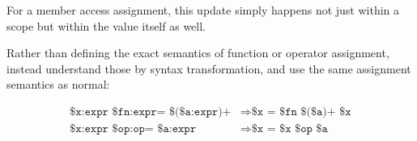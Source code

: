 For a member access assignment, this update simply happens not just within
a scope but within the value itself as well.

\begin{prooftree}
\end{prooftree}

Rather than defining the exact semantics of function or operator assignment,
instead understand those by syntax transformation, and use the same assignment
semantics as normal:

\begin{align*}
    \texttt{\$x:expr \$fn:expr= \$(\$a:expr)+} &\Rightarrow \texttt{\$x = \$fn \$(\$a)+ \$x} \\ %
    \texttt{\$x:expr \$op:op= \$a:expr} & \Rightarrow \texttt{\$x = \$x \$op \$a} \\ %
\end{align*}
